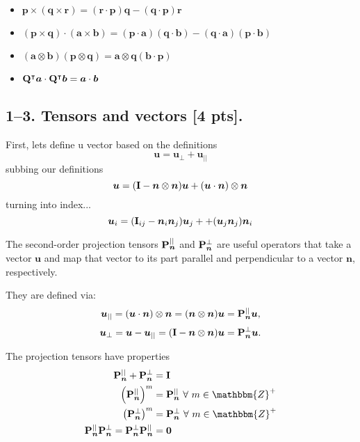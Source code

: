 \begin{itemize}
    \item $\bm{p} \times (\bm{q} \times \bm{r}) = (\bm{r} \cdot \bm{p}) \bm{q} - (\bm{q} \cdot \bm{p}) \bm{r}$
    \item $(\bm{p} \times \bm{q}) \cdot (\bm{a} \times \bm{b}) = (\bm{p} \cdot \bm{a}) (\bm{q} \cdot \bm{b}) - (\bm{q} \cdot \bm{a})(\bm{p} \cdot \bm{b})$
    \item $(\bm{a} \otimes \bm{b})(\bm{p} \otimes \bm{q}) = \bm{a}\otimes\bm{q}(\bm{b} \cdot \bm{p}) $
    \item $\mathbf{Q}^\intercal\bm{a} \cdot \mathbf{Q}^\intercal\bm{b} = \bm{a}\cdot\bm{b} $
\end{itemize}

\subsection*{1--3. \textbf{Tensors and vectors} [4 pts].}
First, lets define u vector based on the definitions
\begin{equation}
    \bm{u}=\bm{u}_{\perp}+\bm{u}_{||}
\end{equation}
subbing our definitions
\begin{equation}
    \bm{u}=(\mathbf{I} - \bm{n} \otimes \bm{n}) \bm{u}+(\bm{u} \cdot \bm{n}) \otimes \bm{n}
\end{equation}
turning into index...
\begin{equation}
    \bm{u}_i = (\mathbf{I}_{ij} - \bm{n}_{i}\bm{n}_j) \bm{u}_j++(\bm{u}_j \bm{n}_j)\bm{n}_i
\end{equation}

The second-order projection tensors $\mathbf{P}_{\bm{n}}^{||}$ and $\mathbf{P}_{\bm{n}}^{\perp}$ are useful operators that take a vector $\bm{u}$ and map that vector to its part parallel and perpendicular to a vector $\bm{n}$, respectively. 

They are defined via:
\begin{equation*}
    \bm{u}_{||} = (\bm{u} \cdot \bm{n}) \otimes \bm{n} = (\bm{n} \otimes \bm{n}) \bm{u} = \mathbf{P}_{\bm{n}}^{||} \bm{u},
\end{equation*}
\begin{equation*}
    \bm{u}_{\perp} = \bm{u} - \bm{u}_{||} = (\mathbf{I} - \bm{n} \otimes \bm{n}) \bm{u} = \mathbf{P}_{\bm{n}}^{\perp} \bm{u}.
\end{equation*}

The projection tensors have properties
\begin{align*}
    \bn{P}_{\bm{n}}^{||} + \bn{P}_{\bm{n}}^{\perp} &= \bn{I} \\
    \left(\bn{P}_{\bm{n}}^{||} \right)^m &= \bn{P}_{\bm{n}}^{||} ~\forall ~m \in \mathbbm{Z}^+\\
    \left(\bn{P}_{\bm{n}}^{\perp} \right)^m &= \bn{P}_{\bm{n}}^{\perp} ~\forall ~m \in \mathbbm{Z}^+\\
    \bn{P}_{\bm{n}}^{||} \bn{P}_{\bm{n}}^{\perp} = \bn{P}_{\bm{n}}^{\perp} \bn{P}_{\bm{n}}^{||}  &= \bn{0}
\end{align*}

